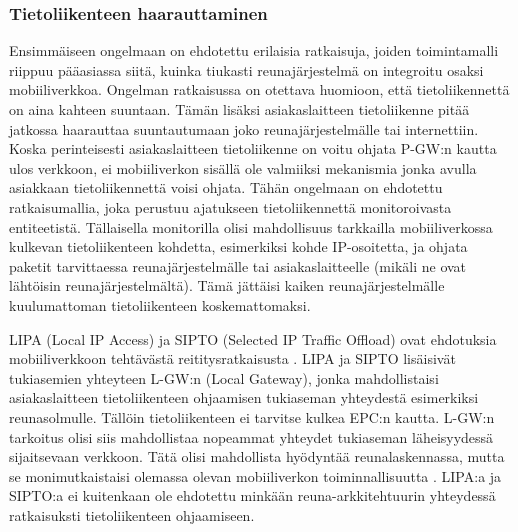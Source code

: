 \subsubsection*{Tietoliikenteen haarauttaminen}
Ensimmäiseen ongelmaan on ehdotettu erilaisia ratkaisuja, joiden toimintamalli riippuu pääasiassa siitä, kuinka tiukasti reunajärjestelmä on integroitu osaksi mobiiliverkkoa.
Ongelman ratkaisussa on otettava huomioon, että tietoliikennettä on aina kahteen suuntaan. Tämän lisäksi asiakaslaitteen tietoliikenne pitää jatkossa haarauttaa suuntautumaan joko reunajärjestelmälle tai internettiin. 
Koska perinteisesti asiakaslaitteen tietoliikenne on voitu ohjata P-GW:n kautta ulos verkkoon, ei mobiiliverkon sisällä ole valmiiksi mekanismia jonka avulla asiakkaan tietoliikennettä voisi ohjata.
Tähän ongelmaan on ehdotettu ratkaisumallia, joka perustuu ajatukseen tietoliikennettä monitoroivasta entiteetistä.
Tällaisella monitorilla olisi mahdollisuus tarkkailla mobiiliverkossa kulkevan tietoliikenteen kohdetta, esimerkiksi kohde IP-osoitetta, ja ohjata paketit tarvittaessa reunajärjestelmälle tai asiakaslaitteelle (mikäli ne ovat lähtöisin reunajärjestelmältä).
Tämä jättäisi kaiken reunajärjestelmälle kuulumattoman tietoliikenteen koskemattomaksi.

LIPA (Local IP Access) ja SIPTO (Selected IP Traffic Offload) ovat ehdotuksia mobiiliverkkoon tehtävästä reititysratkaisusta \cite{samdanis2012traffic,3gpplipa}.
LIPA ja SIPTO lisäisivät tukiasemien yhteyteen L-GW:n (Local Gateway), jonka mahdollistaisi asiakaslaitteen tietoliikenteen ohjaamisen tukiaseman yhteydestä esimerkiksi reunasolmulle. 
Tällöin tietoliikenteen ei tarvitse kulkea EPC:n kautta. 
L-GW:n tarkoitus olisi siis mahdollistaa nopeammat yhteydet tukiaseman läheisyydessä sijaitsevaan verkkoon. Tätä olisi mahdollista hyödyntää reunalaskennassa, mutta se monimutkaistaisi olemassa olevan mobiiliverkon toiminnallisuutta \cite{cho2014smore}.
LIPA:a ja SIPTO:a ei kuitenkaan ole ehdotettu minkään reuna-arkkitehtuurin yhteydessä ratkaisuksti tietoliikenteen ohjaamiseen. 


